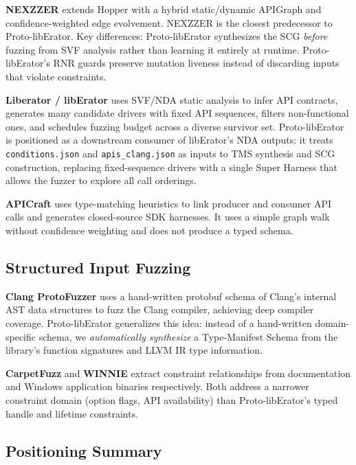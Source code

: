\documentclass[sigconf,anonymous]{acmart}
\begin{document}
\textbf{NEXZZER} \cite{nexzzer_ndss25} extends Hopper with a hybrid
static/dynamic APIGraph and confidence-weighted edge evolvement.
NEXZZER is the closest predecessor to Proto-libErator.  Key differences:
Proto-libErator synthesizes the SCG \emph{before} fuzzing from SVF
analysis rather than learning it entirely at runtime.
Proto-libErator's RNR guards preserve mutation liveness instead of
discarding inputs that violate constraints.

\textbf{Liberator / libErator} \cite{liberator_fse25} uses SVF/NDA
static analysis to infer API contracts, generates many candidate drivers
with fixed API sequences, filters non-functional ones, and schedules
fuzzing budget across a diverse survivor set.  Proto-libErator is
positioned as a downstream consumer of libErator's NDA outputs:
it treats \texttt{conditions.json} and \texttt{apis\_clang.json} as
inputs to TMS synthesis and SCG construction, replacing fixed-sequence
drivers with a single Super Harness that allows the fuzzer to explore
all call orderings.

\textbf{APICraft} \cite{apicraft21} uses type-matching heuristics to
link producer and consumer API calls and generates closed-source SDK
harnesses.  It uses a simple graph walk without confidence weighting
and does not produce a typed schema.

\subsection*{Structured Input Fuzzing}

\textbf{Clang ProtoFuzzer} \cite{clang_proto_fuzzer} uses a hand-written
protobuf schema of Clang's internal AST data structures to fuzz the
Clang compiler, achieving deep compiler coverage.  Proto-libErator
generalizes this idea: instead of a hand-written domain-specific schema,
we \emph{automatically synthesize} a Type-Manifest Schema from the
library's function signatures and LLVM IR type information.

\textbf{CarpetFuzz} \cite{carpetfuzz23} and \textbf{WINNIE} \cite{winnie21}
extract constraint relationships from documentation and Windows
application binaries respectively.  Both address a narrower constraint
domain (option flags, API availability) than Proto-libErator's typed
handle and lifetime constraints.

\subsection*{Positioning Summary}
\end{document}

